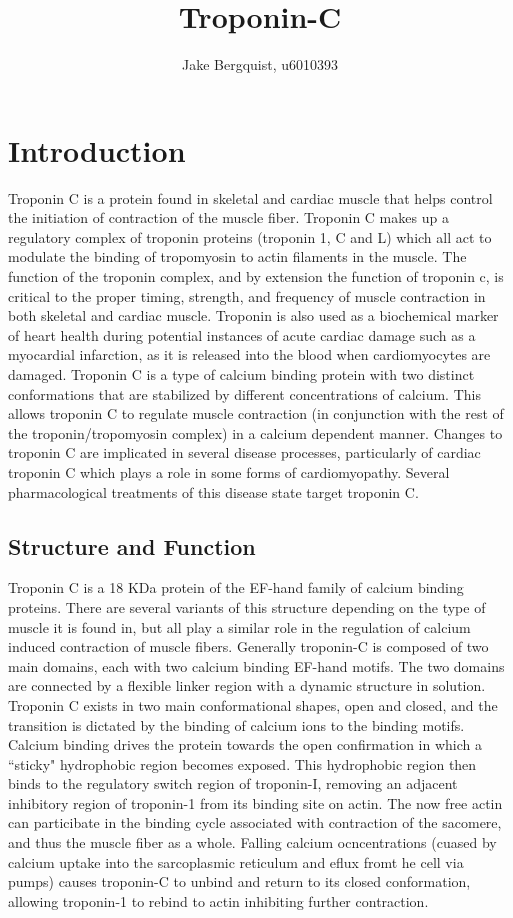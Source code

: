 \documentclass[12pt]{article}
\begin{document}
\title{Troponin-C }
\author{Jake Bergquist, u6010393 }
\maketitle

\section{Introduction}
Troponin C is a protein found in skeletal and cardiac muscle that helps control the initiation of contraction of the muscle fiber. Troponin C makes up a regulatory complex of troponin proteins (troponin 1, C and L) which all act to modulate the binding of tropomyosin to actin filaments in the muscle. The function of the troponin complex, and by extension the function of troponin c, is critical to the proper timing, strength, and frequency of muscle contraction in both skeletal and cardiac muscle. Troponin is also used as a biochemical marker of heart health during potential instances of acute cardiac damage such as a myocardial infarction, as it is released into the blood when cardiomyocytes are damaged. Troponin C is a type of calcium binding protein with two distinct conformations that are stabilized by different concentrations of calcium. This allows troponin C to regulate muscle contraction (in conjunction with the rest of the troponin/tropomyosin complex) in a calcium dependent manner. Changes to troponin C are implicated in several disease processes, particularly of cardiac troponin C which plays a role in some forms of cardiomyopathy. Several pharmacological treatments of this disease state target troponin C.

\subsection{Structure and Function}
Troponin C is a 18 KDa  protein of the EF-hand family of calcium binding proteins. There are several variants of this structure depending on the type of muscle it is found in, but all play a similar role in the regulation of calcium induced contraction of muscle fibers. Generally troponin-C is composed of two main domains, each with two calcium binding EF-hand motifs. The two domains are connected by a flexible linker region with a dynamic structure in solution. Troponin C exists in two main conformational shapes, open and closed, and the transition is dictated by the binding of calcium ions to the binding motifs. Calcium binding drives the protein towards the open confirmation in which a ``sticky" hydrophobic region becomes exposed. This hydrophobic region then binds to the regulatory switch region of troponin-I, removing an adjacent inhibitory region of troponin-1 from its binding site on actin. The now free actin can particibate in the binding cycle associated with contraction of the sacomere, and thus the muscle fiber as a whole. Falling calcium ocncentrations (cuased by calcium uptake into the sarcoplasmic reticulum and eflux fromt he cell via pumps) causes troponin-C to unbind and return to its closed conformation, allowing troponin-1 to rebind to actin inhibiting further contraction. 
\end{document}
